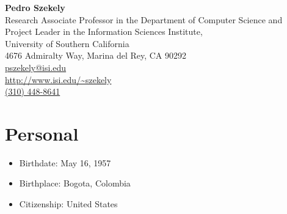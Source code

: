 \documentclass{article}
\begin{document}
\begin{center}
{\LARGE \textbf{ Pedro Szekely}} \\ \vspace{0.2in}
Research Associate Professor in the Department of Computer Science and  \\
Project Leader in the Information Sciences Institute, \\
University of Southern California \\ 
4676 Admiralty Way, Marina del Rey, CA 90292 \\ \vspace{0.2in}
\url{pszekely@isi.edu} \\
\url{http://www.isi.edu/~szekely} \\
\url{(310) 448-8641}\\ \vspace{0.2in}
\end{center}

\section*{Personal}
\begin{itemize}
  \item Birthdate: May 16, 1957
  \item Birthplace: Bogota, Colombia
  \item Citizenship: United States
\end{itemize}

\end{document}
